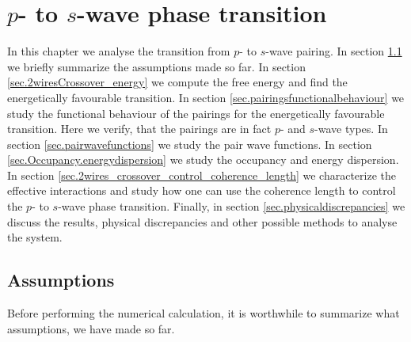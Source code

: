 \chapter{\texorpdfstring{$p$}{p}- to \texorpdfstring{$s$}{s}-wave phase transition} %

\label{Chapter6} 


In this chapter we analyse the transition from $p$- to $s$-wave pairing. In section \ref{sec.assumptions} we briefly summarize the assumptions made so far. In section \ref{sec.2wiresCrossover_energy} we compute the free energy and find the energetically favourable transition. In section \ref{sec.pairingsfunctionalbehaviour} we study the functional behaviour of the pairings for the energetically favourable transition. Here we verify, that the pairings are in fact $p$- and $s$-wave types. In section \ref{sec.pairwavefunctions} we study the pair wave functions. In section \ref{sec.Occupancy.energydispersion} we study the occupancy and energy dispersion. In section \ref{sec.2wires_crossover_control_coherence_length} we characterize the effective interactions and study how one can use the coherence length to control the $p$- to $s$-wave phase transition. Finally, in section \ref{sec.physicaldiscrepancies} we discuss the results, physical discrepancies and other possible methods to analyse the system.  


\section{Assumptions} \label{sec.assumptions}
Before performing the numerical calculation, it is worthwhile to summarize what assumptions, we have made so far. 

